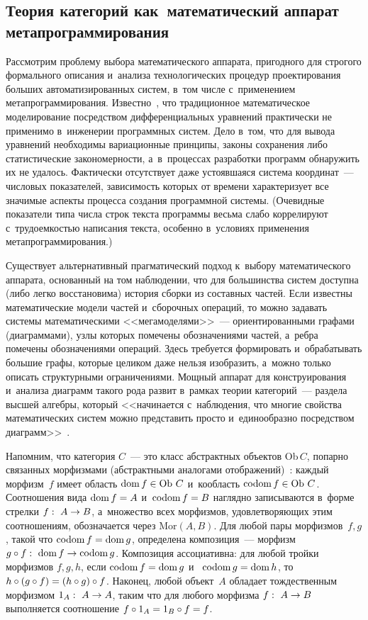 \begin{multicols}{2}
\section{Теория категорий как~математический аппарат 
метапрограммирования}
   
   Рассмотрим проблему выбора математического аппарата, пригодного для 
строгого формального описания и~анализа технологических процедур 
проектирования больших автоматизированных сис\-тем, в~том числе 
с~применением метапрограммирования. Известно~\cite{30-kov}, что 
традиционное математическое моделирование посредством дифференциальных 
уравнений практически не применимо в~инженерии программных систем. Дело 
в~том, что для вывода уравнений необходимы вариационные принципы, 
законы сохранения либо статистические закономерности, а~в~процессах 
разработки программ обнаружить их не удалось. Фактически отсутствует даже 
устоявшаяся система координат~--- числовых показателей, зависимость 
которых от времени характеризует все значимые аспекты процесса создания 
программной системы. (Очевидные показатели типа числа строк текста 
программы весьма слабо коррелируют с~трудоемкостью написания текста, 
особенно в~условиях применения метапрограммирования.)
   
   Существует альтернативный прагматический подход к~выбору 
математического аппарата, основанный на том наблюдении, что для 
большинства систем доступна (либо легко восстановима) история сборки из 
составных частей. Если известны математические модели частей и~сборочных 
операций, то можно задавать системы математическими <<мегамоделями>>~--- 
ориентированными графами (диаграммами), узлы которых помечены 
обозначениями частей, а~ребра помечены обозначениями операций. Здесь 
требуется формировать и~обрабатывать большие графы, которые целиком даже 
нельзя изобразить, а~можно только описать структурными ограничениями. 
Мощный аппарат для конструирования и~анализа диаграмм такого рода развит 
в~рамках теории категорий~--- раздела высшей алгебры, который <<начинается 
с~наблюдения, что многие свойства математических систем можно представить 
просто и~единообразно посредством диаграмм>>~\cite{11-kov}.
   
   Напомним, что категория $C$~--- это класс абстрактных объектов Ob\,$C$, 
попарно связанных морфизмами (абстрактными аналогами 
отображений)~\cite{11-kov}: каждый морфизм~$f$ имеет область 
$\mathrm{dom}\,f\hm\in\mathrm{Ob}~C$ и~кообласть $\mathrm{codom}\,f\hm\in 
\mathrm{Ob}~C$. Соотношения вида $\mathrm{dom}\,f\hm=A$ 
и~$\mathrm{codom}\,f\hm=B$ наглядно записываются в~форме стрелки $f:\ 
A\hm\to B$, а~множество всех морфизмов, удовлетворяющих этим 
соотношениям, обозначается через $\mathrm{Mor}\left(A,B\right)$. Для любой 
пары морфизмов~$f,g$, такой что $\mathrm{codom}\,f\hm=\mathrm{dom}\,g$, 
определена композиция~--- морфизм $g\circ f:\ \mathrm{dom}\,f\hm\to 
\mathrm{codom}\,g$. Композиция ассоциативна: для любой тройки морфизмов 
$f, g, h$, если $\mathrm{codom}\,f\hm=\mathrm{dom}\,g$ и~
$\mathrm{codom}\,g\hm=\mathrm{dom}\,h$, то $h\circ (g\circ f)\hm=(h\circ g)\circ 
f$. Наконец, любой объект~$A$ обладает тождественным морфизмом $1_A:\ 
A\hm\to A$, таким что для любого морфизма $f:\ A\hm\to B$ выполняется 
соотношение $f\circ 1_A\hm= 1_B\circ f\hm=f$.
   

\end{multicols}
